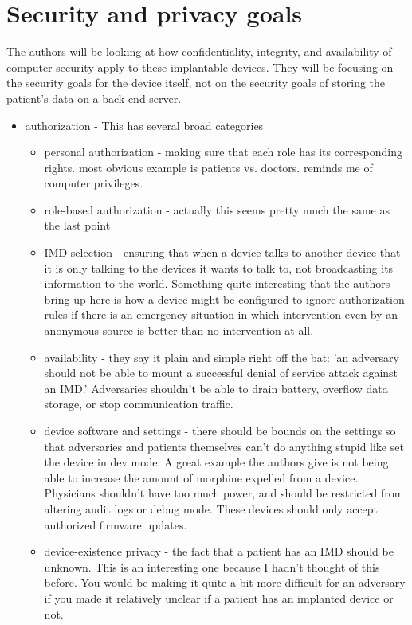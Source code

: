 \documentclass{article}
\begin{document}
\section*{Security and privacy goals}
The authors will be looking at how confidentiality, integrity, and availability of computer security apply to these implantable devices. They will be focusing on the security goals for the device itself, not on the security goals of storing the patient's data on a back end server.

\begin{itemize}
\item authorization - This has several broad categories
\begin{itemize}
\item personal authorization - making sure that each role has its corresponding rights. most obvious example is patients vs. doctors. reminds me of computer privileges. 
\item role-based authorization - actually this seems pretty much the same as the last point
\item IMD selection - ensuring that when a device talks to another device that it is only talking to the devices it wants to talk to, not broadcasting its information to the world. Something quite interesting that the authors bring up here is how a device might be configured to ignore authorization rules if there is an emergency situation in which intervention even by an anonymous source is better than no intervention at all. 
\item availability - they say it plain and simple right off the bat: 'an adversary should not be able to mount a successful denial of service attack against an IMD.' Adversaries shouldn't be able to drain battery, overflow data storage, or stop communication traffic. 
\item device software and settings - there should be bounds on the settings so that adversaries and patients themselves can't do anything stupid like set the device in dev mode. A great example the authors give is not being able to increase the amount of morphine expelled from a device. Physicians shouldn't have too much power, and should be restricted from altering audit logs or debug mode. These devices should only accept authorized firmware updates. 
\item device-existence privacy - the fact that a patient has an IMD should be unknown. This is an interesting one because I hadn't thought of this before. You would be making it quite a bit more difficult for an adversary if you made it relatively unclear if a patient has an implanted device or not. 

\end{itemize}
\end{itemize}
\end{document}
